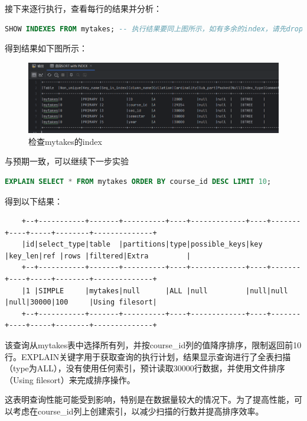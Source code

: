 \documentclass{article}
\begin{document}
	接下来逐行执行，查看每行的结果并分析：
	
	\begin{lstlisting}[language=sql, title=索引对查询性能的影响, tabsize=4]
	SHOW INDEXES FROM mytakes; -- 执行结果要同上图所示，如有多余的index，请先drop删除掉
	\end{lstlisting}
	
	得到结果如下图所示：
	
	\begin{figure}[H]
		\centering
		\includegraphics[width=13cm]{./images/5.检查mytakes的index.png}
		\caption{检查mytakes的index}
	\end{figure}
	
	与预期一致，可以继续下一步实验
	
	\begin{lstlisting}[language=sql, title=索引对查询性能的影响, tabsize=4]
	EXPLAIN SELECT * FROM mytakes ORDER BY course_id DESC LIMIT 10;
	\end{lstlisting}
	
	得到以下结果：
	
	\begin{verbatim}
	+--+-----------+-------+----------+----+-------------+----+-------+----+-----+--------+--------------+
	|id|select_type|table  |partitions|type|possible_keys|key |key_len|ref |rows |filtered|Extra         |
	+--+-----------+-------+----------+----+-------------+----+-------+----+-----+--------+--------------+
	|1 |SIMPLE     |mytakes|null      |ALL |null         |null|null   |null|30000|100     |Using filesort|
	+--+-----------+-------+----------+----+-------------+----+-------+----+-----+--------+--------------+
	\end{verbatim}
	
	该查询从mytakes表中选择所有列，并按course\_id列的值降序排序，限制返回前10行。EXPLAIN关键字用于获取查询的执行计划，结果显示查询进行了全表扫描（type为ALL），没有使用任何索引，预计读取30000行数据，并使用文件排序（Using filesort）来完成排序操作。
	
	这表明查询性能可能受到影响，特别是在数据量较大的情况下。为了提高性能，可以考虑在course\_id列上创建索引，以减少扫描的行数并提高排序效率。
	
\end{document}
